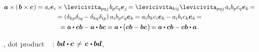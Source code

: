 \begin{otherlanguage}{russian}
\nopagebreak\vspace{-0.55em}\begin{multline}
\bm{a} \times \hspace{-0.15ex} \left(\hspace{.2ex}{\bm{b} \times \bm{c}}\hspace{.15ex}\right)
= a_i \bm{e}_i \times \levicivita_{pqj} \hspace{.2ex} b_p c_q \bm{e}_j \hspace{-0.2ex}
= \levicivita_{ki\hspace{-0.1ex}j} \levicivita_{pqj} \hspace{.2ex} a_i b_p c_q \bm{e}_k \hspace{-0.2ex} =
\\
= \left({\delta_{kp}\delta_{iq} \hspace{-0.2ex} - \delta_{kq}\delta_{ip}}\right) a_i b_p c_q \bm{e}_k \hspace{-0.2ex}
= a_i b_k c_i \bm{e}_k \hspace{-0.15ex} - a_i b_i c_k \bm{e}_k \hspace{-0.2ex} =
\\
= \bm{a} \dotp \bm{c} \bm{b} - \bm{a} \dotp \bm{b} \bm{c}
= \bm{a} \dotp \hspace{-0.1ex} \bigl( \bm{c} \bm{b} - \bm{b} \bm{c} \hspace{.15ex} \bigr) \hspace{-0.3ex}
= \bm{a} \dotp \bm{c} \bm{b} - \bm{c} \bm{b} \dotp \bm{a}
\hspace{.1ex} .
\end{multline}

\end{otherlanguage}

\vspace{-0.16em}\noindent
{}, dot product  ~ :\ru{\hspace{.2ex}}
${\bm{b} \bm{d} \hspace{.1ex} \dotp \bm{c} \hspace{.25ex} \neq \hspace{.25ex} \bm{c} \hspace{.1ex} \dotp \bm{b} \bm{d}}$,
~ 

